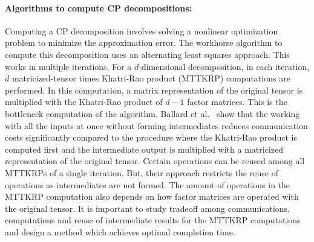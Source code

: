 \documentclass[a4paper,11pt]{article}
\newcommand{\bora}[1]{{\color{magenta} \emph{#1}}}
\newcommand{\sk}[1]{{\color{blue} \emph{#1}}}
\begin{document}

	
	
	\vspace*{-0.325cm}\paragraph{Algorithms to compute CP decompositions:}
	Computing a CP decomposition involves solving a nonlinear optimization problem to minimize the approximation error. The workhorse algorithm to compute this decomposition uses an alternating least squares approach. This works in multiple iterations. For a $d$-dimensional decomposition, in each iteration, $d$ matricized-tensor times Khatri-Rao product (MTTKRP) computations are performed. In this computation, a matrix representation of the original tensor is multiplied with the Khatri-Rao product of $d-1$ factor matrices. This is the bottleneck computation of the algorithm. 
	Ballard et al.~\cite{BNR-IPDPS-2018} show that the working
	with all the inputs at once without forming intermediates reduces communication costs significantly compared to the procedure where the Khatri-Rao product is computed first and the intermediate output is multiplied with a matricized representation of the original tensor. Certain operations can be reused among all MTTKRPs of a single iteration. But, their approach restricts the reuse of operations as intermediates are not formed. The amount of operations in the MTTKRP computation also depends on how factor matrices are operated with the original tensor.
	It is important to study tradeoff among communications, computations and reuse of intermediate results for the MTTKRP computations and design a method which achieves optimal completion time.\vspace*{-0.125cm}
	
	
\end{document}
